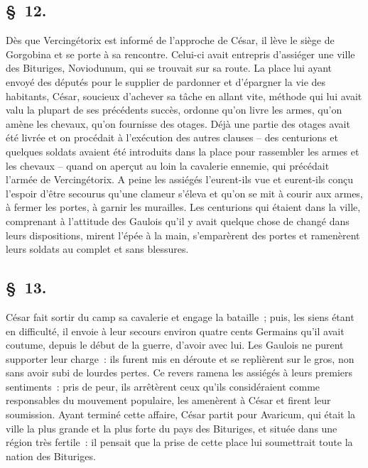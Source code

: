 \documentclass[french,twoside]{book} %
\begin{document}
\subsection[{§ 12.}]{ \textsc{§ 12.} }
\noindent Dès que Vercingétorix est informé de l’approche de César, il lève le siège de Gorgobina et se porte à sa rencontre. Celui-ci avait entrepris d’assiéger une ville des Bituriges, Noviodunum, qui se trouvait sur sa route. La place lui ayant envoyé des députés pour le supplier de pardonner et d’épargner la vie des habitants, César, soucieux d’achever sa tâche en allant vite, méthode qui lui avait valu la plupart de ses précédents succès, ordonne qu’on livre les armes, qu’on amène les chevaux, qu’on fournisse des otages. Déjà une partie des otages avait été livrée et on procédait à l’exécution des autres clauses – des centurions et quelques soldats avaient été introduits dans la place pour rassembler les armes et les chevaux – quand on aperçut au loin la cavalerie ennemie, qui précédait l’armée de Vercingétorix. A peine les assiégés l’eurent-ils vue et eurent-ils conçu l’espoir d’être secourus qu’une clameur s’éleva et qu’on se mit à courir aux armes, à fermer les portes, à garnir les murailles. Les centurions qui étaient dans la ville, comprenant à l’attitude des Gaulois qu’il y avait quelque chose de changé dans leurs dispositions, mirent l’épée à la main, s’emparèrent des portes et ramenèrent leurs soldats au complet et sans blessures.
\subsection[{§ 13.}]{ \textsc{§ 13.} }
\noindent César fait sortir du camp sa cavalerie et engage la bataille ; puis, les siens étant en difficulté, il envoie à leur secours environ quatre cents Germains qu’il avait coutume, depuis le début de la guerre, d’avoir avec lui. Les Gaulois ne purent supporter leur charge : ils furent mis en déroute et se replièrent sur le gros, non sans avoir subi de lourdes pertes. Ce revers ramena les assiégés à leurs premiers sentiments : pris de peur, ils arrêtèrent ceux qu’ils considéraient comme responsables du mouvement populaire, les amenèrent à César et firent leur soumission. Ayant terminé cette affaire, César partit pour Avaricum, qui était la ville la plus grande et la plus forte du pays des Bituriges, et située dans une région très fertile : il pensait que la prise de cette place lui soumettrait toute la nation des Bituriges.
\end{document}
